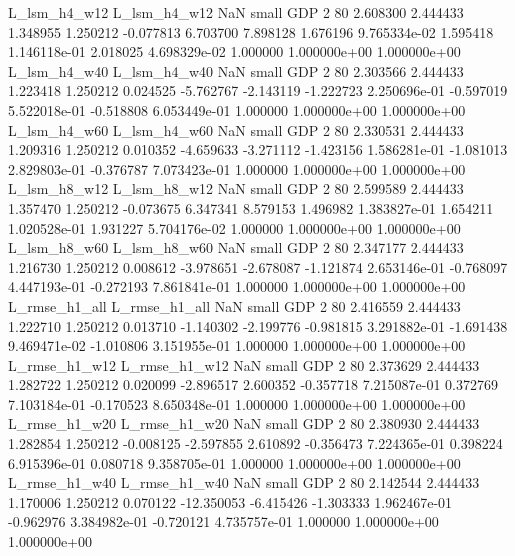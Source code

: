   L_lsm_h4_w12   L_lsm_h4_w12                   NaN      small      GDP                 2 80 2.608300       2.444433 1.348955       1.250212   -0.077813      6.703700      7.898128     1.676196   9.765334e-02  1.595418 1.146118e-01     2.018025   4.698329e-02            1.000000    1.000000e+00        1.000000e+00
  L_lsm_h4_w40   L_lsm_h4_w40                   NaN      small      GDP                 2 80 2.303566       2.444433 1.223418       1.250212    0.024525     -5.762767     -2.143119    -1.222723   2.250696e-01 -0.597019 5.522018e-01    -0.518808   6.053449e-01            1.000000    1.000000e+00        1.000000e+00
  L_lsm_h4_w60   L_lsm_h4_w60                   NaN      small      GDP                 2 80 2.330531       2.444433 1.209316       1.250212    0.010352     -4.659633     -3.271112    -1.423156   1.586281e-01 -1.081013 2.829803e-01    -0.376787   7.073423e-01            1.000000    1.000000e+00        1.000000e+00
  L_lsm_h8_w12   L_lsm_h8_w12                   NaN      small      GDP                 2 80 2.599589       2.444433 1.357470       1.250212   -0.073675      6.347341      8.579153     1.496982   1.383827e-01  1.654211 1.020528e-01     1.931227   5.704176e-02            1.000000    1.000000e+00        1.000000e+00
  L_lsm_h8_w60   L_lsm_h8_w60                   NaN      small      GDP                 2 80 2.347177       2.444433 1.216730       1.250212    0.008612     -3.978651     -2.678087    -1.121874   2.653146e-01 -0.768097 4.447193e-01    -0.272193   7.861841e-01            1.000000    1.000000e+00        1.000000e+00
 L_rmse_h1_all  L_rmse_h1_all                   NaN      small      GDP                 2 80 2.416559       2.444433 1.222710       1.250212    0.013710     -1.140302     -2.199776    -0.981815   3.291882e-01 -1.691438 9.469471e-02    -1.010806   3.151955e-01            1.000000    1.000000e+00        1.000000e+00
 L_rmse_h1_w12  L_rmse_h1_w12                   NaN      small      GDP                 2 80 2.373629       2.444433 1.282722       1.250212    0.020099     -2.896517      2.600352    -0.357718   7.215087e-01  0.372769 7.103184e-01    -0.170523   8.650348e-01            1.000000    1.000000e+00        1.000000e+00
 L_rmse_h1_w20  L_rmse_h1_w20                   NaN      small      GDP                 2 80 2.380930       2.444433 1.282854       1.250212   -0.008125     -2.597855      2.610892    -0.356473   7.224365e-01  0.398224 6.915396e-01     0.080718   9.358705e-01            1.000000    1.000000e+00        1.000000e+00
 L_rmse_h1_w40  L_rmse_h1_w40                   NaN      small      GDP                 2 80 2.142544       2.444433 1.170006       1.250212    0.070122    -12.350053     -6.415426    -1.303333   1.962467e-01 -0.962976 3.384982e-01    -0.720121   4.735757e-01            1.000000    1.000000e+00        1.000000e+00
